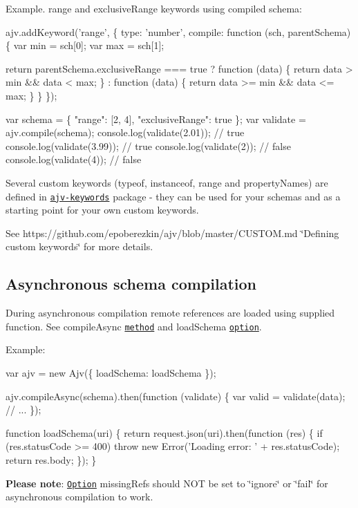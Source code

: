 Example. {\ttfamily range} and {\ttfamily exclusive\+Range} keywords using compiled schema\+:


\begin{DoxyCode}
ajv.addKeyword('range', \{
  type: 'number',
  compile: function (sch, parentSchema) \{
    var min = sch[0];
    var max = sch[1];

    return parentSchema.exclusiveRange === true
            ? function (data) \{ return data > min && data < max; \}
            : function (data) \{ return data >= min && data <= max; \}
  \}
\});

var schema = \{ "range": [2, 4], "exclusiveRange": true \};
var validate = ajv.compile(schema);
console.log(validate(2.01)); // true
console.log(validate(3.99)); // true
console.log(validate(2)); // false
console.log(validate(4)); // false
\end{DoxyCode}


Several custom keywords (typeof, instanceof, range and property\+Names) are defined in \href{https://github.com/epoberezkin/ajv-keywords}{\tt ajv-\/keywords} package -\/ they can be used for your schemas and as a starting point for your own custom keywords.

See https\+://github.com/epoberezkin/ajv/blob/master/\+C\+U\+S\+T\+O\+M.\+md \char`\"{}\+Defining custom keywords\char`\"{} for more details.

\subsection*{Asynchronous schema compilation}

During asynchronous compilation remote references are loaded using supplied function. See {\ttfamily compile\+Async} \href{#api-compileAsync}{\tt method} and {\ttfamily load\+Schema} \href{#options}{\tt option}.

Example\+:


\begin{DoxyCode}
var ajv = new Ajv(\{ loadSchema: loadSchema \});

ajv.compileAsync(schema).then(function (validate) \{
  var valid = validate(data);
  // ...
\});

function loadSchema(uri) \{
  return request.json(uri).then(function (res) \{
    if (res.statusCode >= 400)
      throw new Error('Loading error: ' + res.statusCode);
    return res.body;
  \});
\}
\end{DoxyCode}


{\bfseries Please note}\+: \href{#options}{\tt Option} {\ttfamily missing\+Refs} should N\+OT be set to {\ttfamily \char`\"{}ignore\char`\"{}} or {\ttfamily \char`\"{}fail\char`\"{}} for asynchronous compilation to work.

